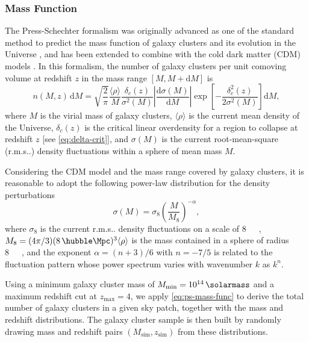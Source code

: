 \documentclass[modern]{aastex62}
\makeatletter
\newcommand{\R}[1]{\mathrm{#1}}
\newcommand{\D}[1]{\R{d} #1}
\newcommand{\diff}[2]{\frac{\D{#1}}{\D{#2}}}
\newcommand{\rms}{r.m.s\@ifnextchar.{}{.\@}}
\makeatother
\begin{document}
\subsubsection{Mass Function}
\label{sec:mass-function}

The Press-Schechter formalism was originally advanced as one of the standard
method to predict the mass function of galaxy clusters and its evolution
in the Universe \citep{press1974}, and has been extended to combine with
the cold dark matter (CDM) models \citep[e.g.,][]{bond1991,lacey1993}.
In this formalism, the number of galaxy clusters per unit comoving volume
at redshift $z$ in the mass range $[M, M + \R{d}M]$ is
\begin{equation}
  \label{eq:ps-mass-func}
  n(M, z) \,\D{M} = \sqrt{\frac{2}{\pi}} \frac{\langle{\rho}\rangle}{M}
  \frac{\delta_c(z)}{\sigma^2(M)} \left| \diff{\sigma(M)}{M} \right|
  \exp\!\left[ -\frac{\delta_c^2(z)}{2\sigma^2(M)} \right] \D{M},
\end{equation}
where $M$ is the virial mass of galaxy clusters,
$\langle {\rho} \rangle$ is the current mean density of the Universe,
$\delta_c(z)$ is the critical linear overdensity for a region to collapse
at redshift $z$ [see \autoref{eq:delta-crit}],
and $\sigma(M)$ is the current root-mean-square (\rms) density
fluctuations within a sphere of mean mass $M$.

Considering the CDM model and the mass range covered by galaxy clusters,
it is reasonable to adopt the following power-law distribution for the
density perturbations \citep{sarazin2002,randall2002}
\begin{equation}
  \label{eq:sigma-mass}
  \sigma(M) = \sigma_8 \left( \frac{M}{M_8} \right)^{-\alpha},
\end{equation}
where $\sigma_8$ is the current \rms{} density fluctuations on
a scale of \SI{8}{\per\hubble\Mpc},
$M_8 = (4\pi/3)(8 \,\si{\per\hubble\Mpc})^3 \langle{\rho}\rangle$
is the mass contained in a sphere of radius \SI{8}{\per\hubble\Mpc},
and the exponent $\alpha = (n+3)/6$ with $n = -7/5$ \citep{randall2002}
is related to the fluctuation pattern whose power spectrum varies
with wavenumber $k$ as $k^n$.

Using a minimum galaxy cluster mass of
$M_{\R{min}} = \SI{e14}{\solarmass}$
and a maximum redshift cut at $z_{\R{max}} = 4$,
we apply \autoref{eq:ps-mass-func} to derive the total number of
galaxy clusters in a given sky patch, together with the mass and
redshift distributions.
The galaxy cluster sample is then built by randomly drawing mass and
redshift pairs $(M_{\R{sim}}, z_{\R{sim}})$ from these distributions.
\end{document}
